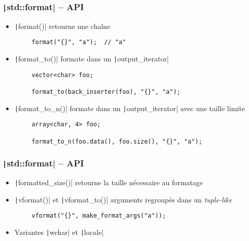 \documentclass[C++.tex]{subfiles}
\begin{document}
\begin{frame}[fragile]
	\frametitle{\texttt|std::format| -- API}
	\begin{itemize}
		\item \texttt|format()| retourne une chaîne
	\end{itemize}

	\begin{verbatim}
		format("{}", "a");  // "a"
	\end{verbatim}

	\begin{itemize}
		\item \texttt|format_to()| formate dans un \texttt|output_iterator|
	\end{itemize}

	\begin{verbatim}
		vector<char> foo;

		format_to(back_inserter(foo), "{}", "a");
	\end{verbatim}


	\begin{itemize}
		\item \texttt|format_to_n()| formate dans un \texttt|output_iterator| avec une taille limite
	\end{itemize}

	\begin{verbatim}
		array<char, 4> foo;

		format_to_n(foo.data(), foo.size(), "{}", "a");
	\end{verbatim}

\end{frame}

\begin{frame}[fragile]
	\frametitle{\texttt|std::format| -- API}
	\begin{itemize}
		\item \texttt|formatted_size()| retourne la taille nécessaire au formatage
		\item \texttt|vformat()| et \texttt|vformat_to()| arguments regroupés dans un \textit{tuple-like}
	\end{itemize}

	\begin{verbatim}
		vformat("{}", make_format_args("a"));
	\end{verbatim}

	\begin{itemize}
		\item Variantes \texttt|wchar| et \texttt|locale|
	\end{itemize}
\end{frame}
\end{document}
